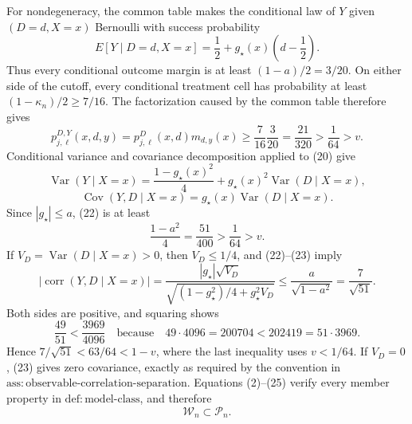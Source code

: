 For nondegeneracy, the common table makes the conditional law of \(Y\) given \((D=d,X=x)\) Bernoulli with success probability
\[
 E[Y\mid D=d,X=x]=\frac12+g_\star(x)\left(d-\frac12\right).
 \tag{20}
\]
Thus every conditional outcome margin is at least \((1-a)/2=3/20\).  On either side of the cutoff, every conditional treatment cell has probability at least \((1-\kappa_n)/2\ge7/16\).  The factorization caused by the common table therefore gives
\[
 p_{j,\ell}^{D,Y}(x,d,y)
 =p_{j,\ell}^{D}(x,d)m_{d,y}(x)
 \ge\frac7{16}\frac3{20}=\frac{21}{320}>\frac1{64}>v.
 \tag{21}
\]
Conditional variance and covariance decomposition applied to (20) give
\[
 \operatorname{Var}(Y\mid X=x)
 =\frac{1-g_\star(x)^2}{4}
  +g_\star(x)^2\operatorname{Var}(D\mid X=x),
 \tag{22}
\]
\[
 \operatorname{Cov}(Y,D\mid X=x)
 =g_\star(x)\operatorname{Var}(D\mid X=x).
 \tag{23}
\]
Since \(|g_\star|\le a\), (22) is at least
\[
 \frac{1-a^2}{4}=\frac{51}{400}>\frac1{64}>v.
 \tag{24}
\]
If \(V_D=\operatorname{Var}(D\mid X=x)>0\), then \(V_D\le1/4\), and (22)--(23) imply
\[
 |\operatorname{corr}(Y,D\mid X=x)|
 =\frac{|g_\star|\sqrt{V_D}}
        {\sqrt{(1-g_\star^2)/4+g_\star^2V_D}}
 \le\frac{a}{\sqrt{1-a^2}}
 =\frac7{\sqrt{51}}.
 \tag{25}
\]
Both sides are positive, and squaring shows
\[
 \frac{49}{51}<\frac{3969}{4096}
 \quad\text{because}\quad
 49\cdot4096=200704<202419=51\cdot3969.
\]
Hence \(7/\sqrt{51}<63/64<1-v\), where the last inequality uses \(v<1/64\).  If \(V_D=0\), (23) gives zero covariance, exactly as required by the convention in \(\mathrm{ass:observable\mbox{-}correlation\mbox{-}separation}\).  Equations (2)--(25) verify every member property in \(\mathrm{def:model\mbox{-}class}\), and therefore
\[
 \mathcal W_n\subset\mathcal P_n.
 \tag{26}
\]

